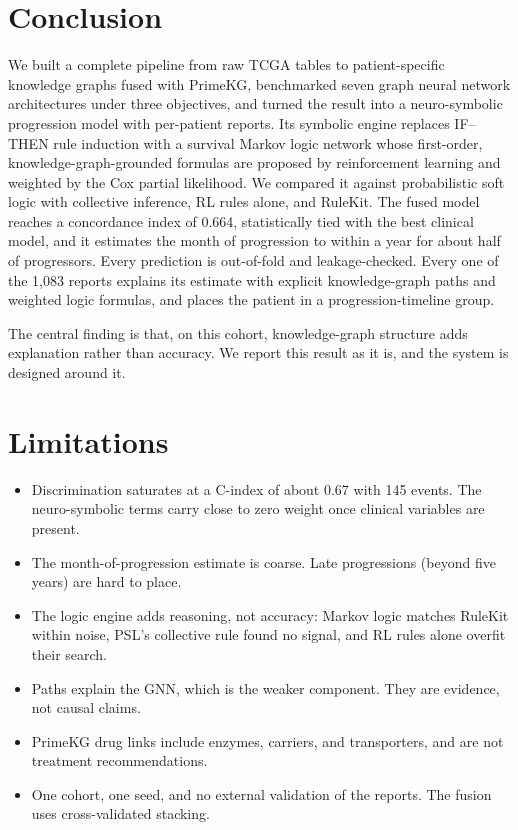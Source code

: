 \documentclass{mnnit}
\begin{document}
\section{Conclusion}
We built a complete pipeline from raw TCGA tables to patient-specific knowledge graphs fused with PrimeKG,
benchmarked seven graph neural network architectures under three objectives, and turned the result into a
neuro-symbolic progression model with per-patient reports. Its symbolic engine replaces IF--THEN rule induction
with a survival Markov logic network whose first-order, knowledge-graph-grounded formulas are proposed by
reinforcement learning and weighted by the Cox partial likelihood. We compared it against probabilistic soft logic
with collective inference, RL rules alone, and RuleKit. The fused model reaches a concordance index of 0.664,
statistically tied with the best clinical model, and it estimates the month of progression to within a year for
about half of progressors. Every prediction is out-of-fold and leakage-checked.
Every one of the 1,083 reports explains its estimate with explicit knowledge-graph paths and weighted logic
formulas, and
places the patient in a progression-timeline group.

The central finding is that, on this cohort, knowledge-graph structure adds explanation rather than accuracy. We
report this result as it is, and the system is designed around it.

\section{Limitations}
\begin{itemize}
  \item Discrimination saturates at a C-index of about 0.67 with 145 events. The neuro-symbolic terms carry close to
        zero weight once clinical variables are present.
  \item The month-of-progression estimate is coarse. Late progressions (beyond five years) are hard to place.
  \item The logic engine adds reasoning, not accuracy: Markov logic matches RuleKit within noise, PSL's collective
        rule found no signal, and RL rules alone overfit their search.
  \item Paths explain the GNN, which is the weaker component. They are evidence, not causal claims.
  \item PrimeKG drug links include enzymes, carriers, and transporters, and are not treatment recommendations.
  \item One cohort, one seed, and no external validation of the reports. The fusion uses cross-validated stacking.
\end{itemize}
\end{document}

